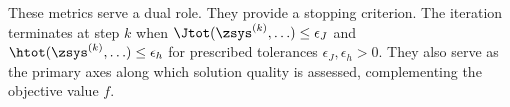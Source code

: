 These metrics serve a dual role. They provide a stopping criterion. The iteration terminates at step \(k\) when \(\Jtot(\zsys^{(k)}, \ldots) \leq \epsilon_J\) and \(\htot(\zsys^{(k)}, \ldots) \leq \epsilon_h\) for prescribed tolerances \(\epsilon_J, \epsilon_h > 0\). They also serve as the primary axes along which solution quality is assessed, complementing the objective value \(f\).
